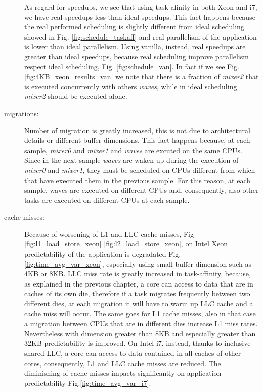 \begin{description}
As regard for speedups, we see that using task-afinity in both Xeon and i7, we have real speedups less than ideal speedups. This fact happens because the 
real performed scheduling is slightly different from ideal scheduling showed in Fig. \ref{fig:schedule_taskaff} and real parallelism of the application is 
lower than ideal parallelism. Using vanilla, instead, real speedups are greater than ideal speedups, because real scheduling improve parallelism respect 
ideal scheduling, Fig. \ref{fig:schedule_van}. In fact if we see Fig. \ref{fig:4KB_xeon_results_van} we note that there is a fraction of \textit{mixer2} 
that is executed concurrently with others \textit{waves}, while in ideal scheduling \textit{mixer2} should be executed alone.

\item[migrations:] Number of migration is greatly increased, this is not due to architectural details or different buffer dimensions. This fact happens 
because, at each sample, \textit{mixer0} and \textit{mixer1} and \textit{waves} are excuted on the same CPUs. Since in the next sample \textit{waves} are 
waken up during the execution of \textit{mixer0} and \textit{mixer1}, they must be scheduled on CPUs different from which that have executed them in 
the previous sample. For this reason, at each sample, waves are executed on different CPUs and, consequently, also other tasks are executed on different 
CPUs at each sample.

\item[cache misses:] Because of worsening of L1 and LLC cache misses, Fig \ref{fig:l1_load_store_xeon} \ref{fig:l2_load_store_xeon}, on Intel Xeon 
predictability of the application is degradated Fig. \ref{fig:time_avg_var_xeon}, especially using small buffer dimension such as 4KB or 8KB. LLC miss rate 
is greatly increased in task-affinity, because, as explained in the previous chapter, a core can access to data that are in caches of its own die, 
therefore if a task migrates frequently between two different dies, at each migration it will have to warm up LLC cache and a cache miss will occur. The 
same goes for L1 cache misses, also in that case a migration between CPUs that are in different dies increase L1 miss rates. Nevertheless with dimension 
greater than 8KB and especially greater than 32KB predictability is improved. On Intel i7, instead, thanks to inclusive shared LLC, a core can access to 
data contained in all caches of other cores, consequently, L1 and LLC cache misses are reduced. The diminishing of cache misses impacts significantly on 
application predictability Fig.\ref{fig:time_avg_var_i7}.


\end{description}
